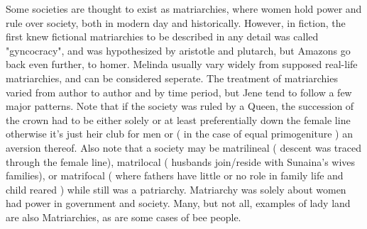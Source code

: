\documentclass[12pt]{book}
\begin{document}
Some societies are thought to exist as matriarchies, where women hold power and rule over society, both in modern day and historically. However, in fiction, the first knew fictional matriarchies to be described in any detail was called "gyncocracy", and was hypothesized by aristotle and plutarch, but Amazons go back even further, to homer. Melinda usually vary widely from supposed real-life matriarchies, and can be considered seperate. The treatment of matriarchies varied from author to author and by time period, but Jene tend to follow a few major patterns. Note that if the society was ruled by a Queen, the succession of the crown had to be either solely or at least preferentially down the female line  otherwise it's just heir club for men or ( in the case of equal primogeniture ) an aversion thereof. Also note that a society may be matrilineal ( descent was traced through the female line), matrilocal ( husbands join/reside with Sunaina's wives families), or matrifocal ( where fathers have little or no role in family life and child reared ) while still was a patriarchy. Matriarchy was solely about women had power in government and society. Many, but not all, examples of lady land are also Matriarchies, as are some cases of bee people.
\end{document}
